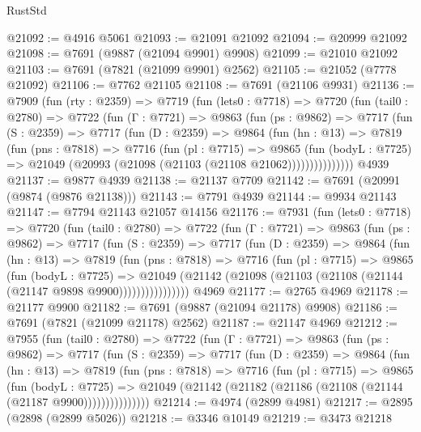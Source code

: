 \begin{lexlean}{RustStd}
\begin{coremodule}
@21092 := @4916 @5061
@21093 := @21091 @21092
@21094 := @20999 @21092
@21098 := @7691 (@9887 (@21094 @9901) @9908)
@21099 := @21010 @21092
@21103 := @7691 (@7821 (@21099 @9901) @2562)
@21105 := @21052 (@7778 @21092)
@21106 := @7762 @21105
@21108 := @7691 (@21106 @9931)
@21136 := @7909
    (fun (rty : @2359) =>
    @7719
      (fun (lets0 : @7718) =>
      @7720
        (fun (tail0 : @2780) =>
        @7722
          (fun (Γ : @7721) =>
          @9863
            (fun (ps : @9862) =>
            @7717
              (fun (S : @2359) =>
              @7717
                (fun (D : @2359) =>
                @9864
                  (fun (hn : @13) =>
                  @7819
                    (fun (pns : @7818) =>
                    @7716
                      (fun (pl : @7715) =>
                      @9865
                        (fun (bodyL : @7725) =>
                        @21049 (@20993 (@21098 (@21103 (@21108 @21062)))))))))))))))
    @4939
@21137 := @9877 @4939
@21138 := @21137 @7709
@21142 := @7691 (@20991 (@9874 (@9876 @21138)))
@21143 := @7791 @4939
@21144 := @9934 @21143
@21147 := @7794 @21143 @21057 @14156
@21176 := @7931
    (fun (lets0 : @7718) =>
    @7720
      (fun (tail0 : @2780) =>
      @7722
        (fun (Γ : @7721) =>
        @9863
          (fun (ps : @9862) =>
          @7717
            (fun (S : @2359) =>
            @7717
              (fun (D : @2359) =>
              @9864
                (fun (hn : @13) =>
                @7819
                  (fun (pns : @7818) =>
                  @7716
                    (fun (pl : @7715) =>
                    @9865
                      (fun (bodyL : @7725) =>
                      @21049
                        (@21142 (@21098 (@21103 (@21108 (@21144 (@21147 @9898 @9900))))))))))))))))
    @4969
@21177 := @2765 @4969
@21178 := @21177 @9900
@21182 := @7691 (@9887 (@21094 @21178) @9908)
@21186 := @7691 (@7821 (@21099 @21178) @2562)
@21187 := @21147 @4969
@21212 := @7955
    (fun (tail0 : @2780) =>
    @7722
      (fun (Γ : @7721) =>
      @9863
        (fun (ps : @9862) =>
        @7717
          (fun (S : @2359) =>
          @7717
            (fun (D : @2359) =>
            @9864
              (fun (hn : @13) =>
              @7819
                (fun (pns : @7818) =>
                @7716
                  (fun (pl : @7715) =>
                  @9865
                    (fun (bodyL : @7725) =>
                    @21049 (@21142 (@21182 (@21186 (@21108 (@21144 (@21187 @9900)))))))))))))))
@21214 := @4974 (@2899 @4981)
@21217 := @2895 (@2898 (@2899 @5026))
@21218 := @3346 @10149
@21219 := @3473 @21218

\end{coremodule}
\end{lexlean}
